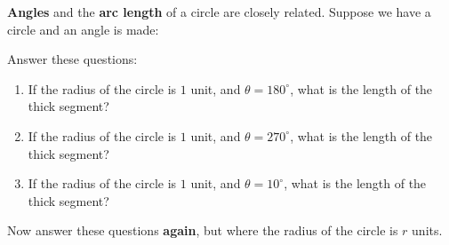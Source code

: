 \documentclass[noauthor,hints,nooutcomes,handout,12pt]{ximera}
\begin{document}
\begin{question}
\textbf{Angles} and the \textbf{arc length} of a circle are closely
related. Suppose we have a circle and an angle is made:

\begin{center}
 
\end{center}
Answer these questions:
\begin{enumerate}
\item If the radius of the circle is $1$ unit, and $\theta=180^\circ$, what is the length of the thick segment?
\item If the radius of the circle is $1$ unit, and $\theta=270^\circ$, what is the length of the thick segment?
\item If the radius of the circle is $1$ unit, and $\theta=10^\circ$, what is the length of the thick segment?
\end{enumerate}
Now answer these questions \textbf{again}, but where the radius of the
circle is $r$ units.
\end{question}
\mynewpage
\end{document}
